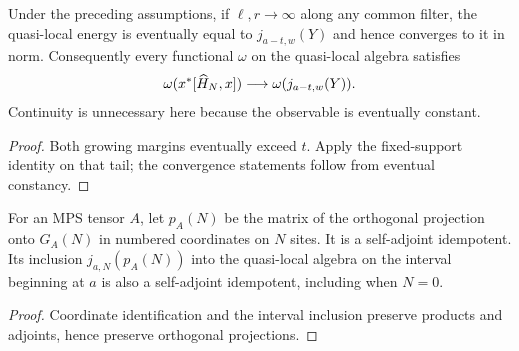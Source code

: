 \begin{lemma}
    \label{thm:quasi_local_commutator_energy_limit}
    \leanok
    Under the preceding assumptions, if $\ell,r\to\infty$ along any common
    filter, the quasi-local energy is eventually equal to $j_{a-t,w}(Y)$ and
    hence converges to it in norm. Consequently every functional $\omega$ on the
    quasi-local algebra satisfies
    \begin{align}
        \omega(x^*[\widehat H_N,x])\longrightarrow\omega(j_{a-t,w}(Y)).
        \notag
    \end{align}
    Continuity is unnecessary here because the observable is eventually constant.
\end{lemma}
\begin{proof}\leanok
    Both growing margins eventually exceed $t$. Apply the fixed-support identity
    on that tail; the convergence statements follow from eventual constancy.
\end{proof}

\begin{definition}
    \label{def:mps_ground_space_projection_matrix}
    \leanok
    For an MPS tensor $A$, let $p_A(N)$ be the matrix of the orthogonal
    projection onto $G_A(N)$ in numbered coordinates on $N$ sites.
    It is a self-adjoint idempotent. Its inclusion $j_{a,N}(p_A(N))$
    into the quasi-local algebra on the interval beginning at $a$ is also
    a self-adjoint idempotent, including when $N=0$.
\end{definition}
\begin{proof}\leanok
    Coordinate identification and the interval inclusion preserve products
    and adjoints, hence preserve orthogonal projections.
\end{proof}

